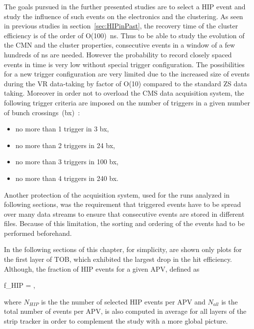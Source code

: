 The goals pursued in the further presented studies are to select a HIP event and study the influence of such events on the electronics and the clustering. As seen in previous studies in section~\ref{sec:HIPinPast}, the recovery time of the cluster efficiency is of the order of O(100)~ns. Thus to be able to study the evolution of the CMN and the cluster properties, consecutive events in a window of a few hundreds of ns are needed. However the probability to record closely spaced events in time is very low without special trigger configuration. The possibilities for a new trigger configuration are very limited due to the increased size of events during the VR data-taking by factor of O(10) compared to the standard ZS data taking. Moreover in order not to overload the CMS data acquisition system, the following trigger criteria are imposed on the number of triggers in a given number of bunch crossings~(bx)~\cite{website:VRtrigger}:

\begin{itemize}
\item{no more than 1 trigger in 3 bx,}
\item{no more than 2 triggers in 24 bx,}
\item{no more than 3 triggers in 100 bx,}
\item{no more than 4 triggers in 240 bx.}
\end{itemize}

Another protection of the acquisition system, used for the runs analyzed in following sections, was the requirement that triggered events have to be spread over many data streams to ensure that consecutive events are stored in different files. Because of this limitation, the sorting and ordering of the events had to be performed beforehand.

In the following sections of this chapter, for simplicity, are shown only plots for the first layer of TOB, which exhibited the largest drop in the hit efficiency. Although, the fraction of HIP events for a given APV, defined as


{
f_{HIP} = ,
}

where $N_{HIP}$ is the the number of selected HIP events per APV and $N_{all}$ is the total number of events per APV, is also computed in average for all layers of the strip tracker in order to complement the study with a more global picture.


